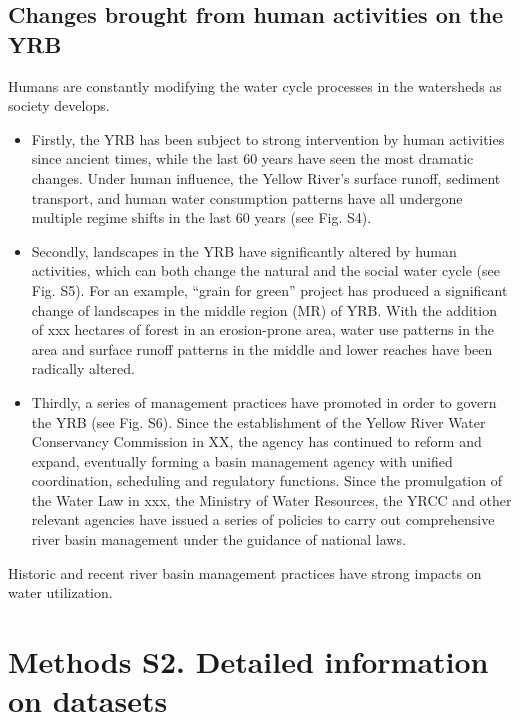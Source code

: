 \documentclass[9pt,twoside,lineno]{pnas-new}
\begin{document}

\subsection*{Changes brought from human activities on the YRB}
Humans are constantly modifying the water cycle processes in the watersheds as society develops.
\begin{itemize}
    \item Firstly, the YRB has been subject to strong intervention by human activities since ancient times, while the last 60 years have seen the most dramatic changes. Under human influence, the Yellow River's surface runoff, sediment transport, and human water consumption patterns have all undergone multiple regime shifts in the last 60 years (see Fig. S4). 
    \item Secondly, landscapes in the YRB have significantly altered by human activities, which can both change the natural and the social water cycle (see Fig. S5). For an example, “grain for green” project has produced a significant change of landscapes in the middle region (MR) of YRB. With the addition of xxx hectares of forest in an erosion-prone area, water use patterns in the area and surface runoff patterns in the middle and lower reaches have been radically altered.
    \item Thirdly, a series of management practices have promoted in order to govern the YRB (see Fig. S6). Since the establishment of the Yellow River Water Conservancy Commission in XX, the agency has continued to reform and expand, eventually forming a basin management agency with unified coordination, scheduling and regulatory functions. Since the promulgation of the Water Law in xxx, the Ministry of Water Resources, the YRCC and other relevant agencies have issued a series of policies to carry out comprehensive river basin management under the guidance of national laws.
\end{itemize}
Historic and recent river basin management practices have strong impacts on water utilization.


\newpage
\section*{Methods S2. Detailed information on datasets}
\end{document}
